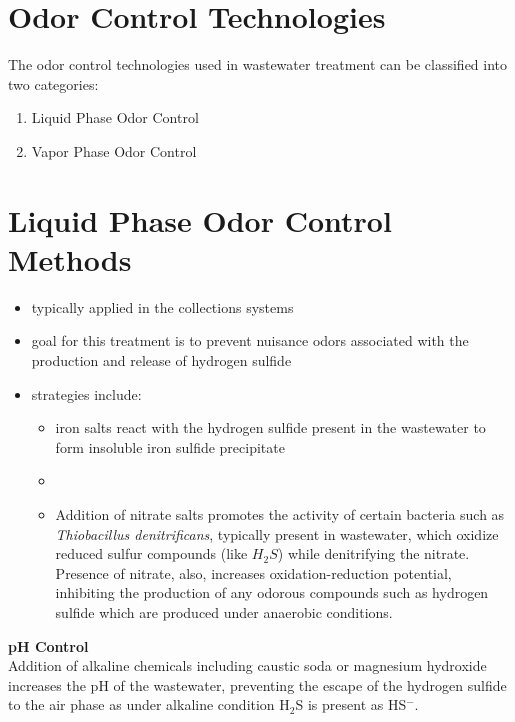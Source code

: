 \section{Odor Control Technologies}
The odor control technologies used in wastewater treatment can be classified into two categories:
\begin{enumerate}
\item Liquid Phase Odor Control
\item Vapor Phase Odor Control
\end{enumerate}

\section{Liquid Phase Odor Control Methods}
\begin{itemize}
	\item typically applied in the collections systems
	\item goal for this treatment is to prevent nuisance odors associated with the production and release of hydrogen sulfide
	\item strategies include:
		\begin{itemize}

			\item iron salts react with the hydrogen sulfide present in the wastewater to form insoluble iron sulfide precipitate
			\item 
			\item Addition of nitrate salts promotes the activity of certain bacteria such as \textit{Thiobacillus denitrificans}, typically present in wastewater, which oxidize reduced sulfur compounds (like $H_2S$) while denitrifying the nitrate.  Presence of nitrate, also, increases oxidation-reduction potential, inhibiting the production of any odorous compounds such as hydrogen sulfide which are produced under anaerobic conditions.
		\end{itemize} 
\end{itemize}

\textbf{pH Control}\\
Addition of alkaline chemicals including caustic soda or magnesium hydroxide increases the pH of the wastewater, preventing the escape of the hydrogen sulfide to the air phase as under alkaline condition H$_2$S is present as HS$^-$.  


